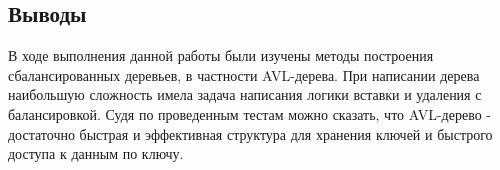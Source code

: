 \documentclass[12pt]{article}
\begin{document}
\subsection*{Выводы}

В ходе выполнения данной работы были изучены методы построения сбалансированных деревьев, в частности AVL-дерева. При написании дерева наибольшую сложность имела задача написания логики вставки и удаления с балансировкой. Судя по проведенным тестам можно сказать, что AVL-дерево - достаточно быстрая и эффективная структура для хранения ключей и быстрого доступа к данным по ключу.
\end{document}
